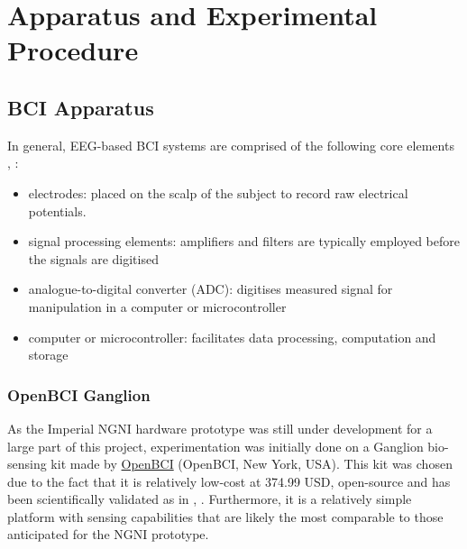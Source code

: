 \chapter{Apparatus and Experimental Procedure}
\label{chapter:experimental-procedure}

\graphicspath{ {report/C4 Experimental Procedure/assets/} } 

\section{BCI Apparatus}

In general, EEG-based BCI systems are comprised of the following core elements \cite{teplan-eeg-measurement}, \cite{bci-survey-nicolas-alonso}:
\begin{itemize}
    \item electrodes: placed on the scalp of the subject to record raw electrical potentials. 
    \item signal processing elements: amplifiers and filters are typically employed before the signals are digitised
    \item analogue-to-digital converter (ADC): digitises measured signal for manipulation in a computer or microcontroller
    \item computer or microcontroller: facilitates data processing, computation and storage
\end{itemize}

\subsection{OpenBCI Ganglion}
As the Imperial NGNI hardware prototype was still under development for a large part of this project, experimentation was initially done on a Ganglion bio-sensing kit made by \href{https://shop.openbci.com/products/ganglion-board?variant=13461804483}{OpenBCI} (OpenBCI, New York, USA). This kit was chosen due to the fact that it is relatively low-cost at 374.99 USD, open-source and has been scientifically validated as in \cite{autthasan-single-chan-ssvep}, \cite{peterson-bci-survey}. Furthermore, it is a relatively simple platform with sensing capabilities that are likely the most comparable to those anticipated for the NGNI prototype.

